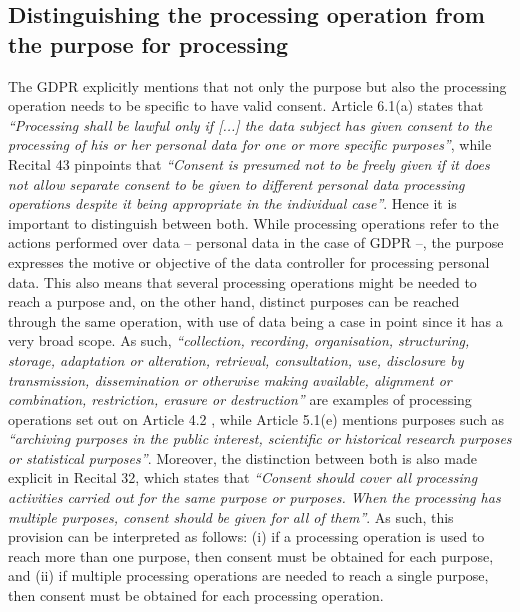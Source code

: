 \subsection{Distinguishing the processing operation from the purpose for processing}
\label{sec:processing_purposes}

The GDPR explicitly mentions that not only the purpose but also the processing operation needs to be specific to have valid consent.
Article 6.1(a) \citeyearpar{noauthor_regulation_2016} states that \textit{``Processing shall be lawful only if [...] the data subject has given consent to the processing of his or her personal data for one or more specific purposes''}, while Recital 43 \citeyearpar{noauthor_regulation_2016} pinpoints that \textit{``Consent is presumed not to be freely given if it does not allow separate consent to be given to different personal data processing operations despite it being appropriate in the individual case''}.
Hence it is important to distinguish between both.
While processing operations refer to the actions performed over data -- personal data in the case of GDPR --, the purpose expresses the motive or objective of the data controller for processing personal data.
This also means that several processing operations might be needed to reach a purpose and, on the other hand, distinct purposes can be reached through the same operation, with use of data being a case in point since it has a very broad scope.
As such, \textit{``collection, recording, organisation, structuring, storage, adaptation or alteration, retrieval, consultation, use, disclosure by transmission, dissemination or otherwise making available, alignment or combination, restriction, erasure or destruction''} are examples of processing operations set out on Article 4.2 \citeyearpar{noauthor_regulation_2016}, while Article 5.1(e) \citeyearpar{noauthor_regulation_2016} mentions purposes such as \textit{``archiving purposes in the public interest, scientific or historical research purposes or statistical purposes''}.
Moreover, the distinction between both is also made explicit in Recital 32, which states that \textit{``Consent should cover all processing activities carried out for the same purpose or purposes. When the processing has multiple purposes, consent should be given for all of them''}.
As such, this provision can be interpreted as follows: (i) if a processing operation is used to reach more than one purpose, then consent must be obtained for each purpose, and (ii) if multiple processing operations are needed to reach a single purpose, then consent must be obtained for each processing operation.

